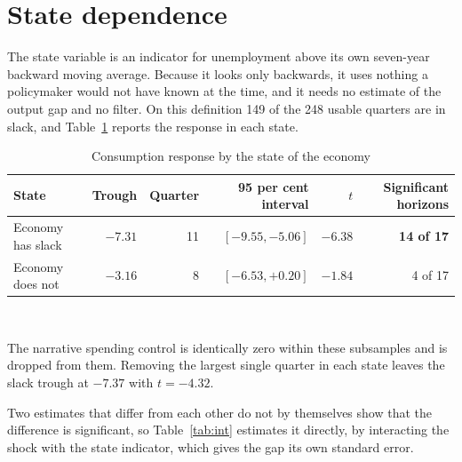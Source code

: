 \documentclass[11pt,a4paper]{article}
\begin{document}
\section{State dependence}\label{sec:state}

The state variable is an indicator for unemployment above its own seven-year backward moving
average. Because it looks only backwards, it uses nothing a policymaker would not have known at the
time, and it needs no estimate of the output gap and no filter. On this definition 149 of the 248
usable quarters are in slack, and Table~\ref{tab:state} reports the response in each state.

\begin{table}[htbp]
\centering
\caption{Consumption response by the state of the economy}
\label{tab:state}
\begin{tabular}{lrrrrr}
\toprule
State & Trough & Quarter & 95 per cent interval & $t$ & Significant horizons \\
\midrule
Economy has slack & $\mathbf{-7.31}$ & 11 & $[-9.55, -5.06]$ & $-6.38$ & \textbf{14 of 17} \\
Economy does not & $-3.16$ & 8 & $[-6.53, +0.20]$ & $-1.84$ & 4 of 17 \\
\bottomrule
\end{tabular}
\\[4pt]
\begin{minipage}{0.86\textwidth}
\footnotesize The narrative spending control is identically zero within these subsamples and is
dropped from them. Removing the largest single quarter in each state leaves the slack trough at
$-7.37$ with $t = -4.32$.
\end{minipage}
\end{table}

Two estimates that differ from each other do not by themselves show that the difference is
significant, so Table~\ref{tab:int} estimates it directly, by interacting the shock with the state
indicator, which gives the gap its own standard error.
\end{document}
